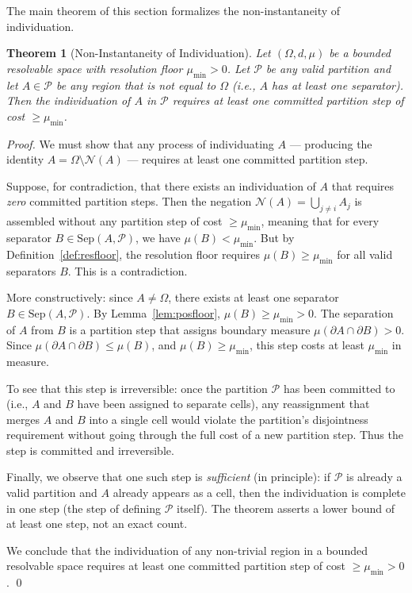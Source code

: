 \documentclass[twocolumn]{article}
\theoremstyle{plain}
\newtheorem{theorem}{Theorem}[section]
\theoremstyle{definition}
\newcommand{\PP}{\mathcal{P}}
\newcommand{\NN}{\mathcal{N}}
\newcommand{\mumin}{\mu_{\min}}
\begin{document}
The main theorem of this section formalizes the non-instantaneity of individuation.

\begin{theorem}[Non-Instantaneity of Individuation]
\label{thm:noninstant}
Let $(\Omega, d, \mu)$ be a bounded resolvable space with resolution floor
$\mumin > 0$. Let $\PP$ be any valid partition and let $A \in \PP$ be any region
that is not equal to $\Omega$ (i.e., $A$ has at least one separator). Then the
individuation of $A$ in $\PP$ requires at least one committed partition step of
cost $\geq \mumin$.
\end{theorem}

\begin{proof}
We must show that any process of individuating $A$ --- producing the identity
$A = \Omega \setminus \NN(A)$ --- requires at least one committed partition step.

Suppose, for contradiction, that there exists an individuation of $A$ that
requires \emph{zero} committed partition steps. Then the negation $\NN(A) =
\bigcup_{j \neq i} A_j$ is assembled without any partition step of cost $\geq
\mumin$, meaning that for every separator $B \in \mathrm{Sep}(A,\PP)$, we have
$\mu(B) < \mumin$. But by Definition~\ref{def:resfloor}, the resolution floor
requires $\mu(B) \geq \mumin$ for all valid separators $B$. This is a
contradiction.

More constructively: since $A \neq \Omega$, there exists at least one separator
$B \in \mathrm{Sep}(A,\PP)$. By Lemma~\ref{lem:posfloor}, $\mu(B) \geq \mumin > 0$.
The separation of $A$ from $B$ is a partition step that assigns boundary measure
$\mu(\partial A \cap \partial B) > 0$. Since $\mu(\partial A \cap \partial B) \leq
\mu(B)$, and $\mu(B) \geq \mumin$, this step costs at least $\mumin$ in measure.

To see that this step is irreversible: once the partition $\PP$ has been committed
to (i.e., $A$ and $B$ have been assigned to separate cells), any reassignment
that merges $A$ and $B$ into a single cell would violate the partition's
disjointness requirement without going through the full cost of a new partition
step. Thus the step is committed and irreversible.

Finally, we observe that one such step is \emph{sufficient} (in principle): if
$\PP$ is already a valid partition and $A$ already appears as a cell, then the
individuation is complete in one step (the step of defining $\PP$ itself). The
theorem asserts a lower bound of at least one step, not an exact count.

We conclude that the individuation of any non-trivial region in a bounded
resolvable space requires at least one committed partition step of cost $\geq
\mumin > 0$. \qed
\end{proof}
\end{document}
